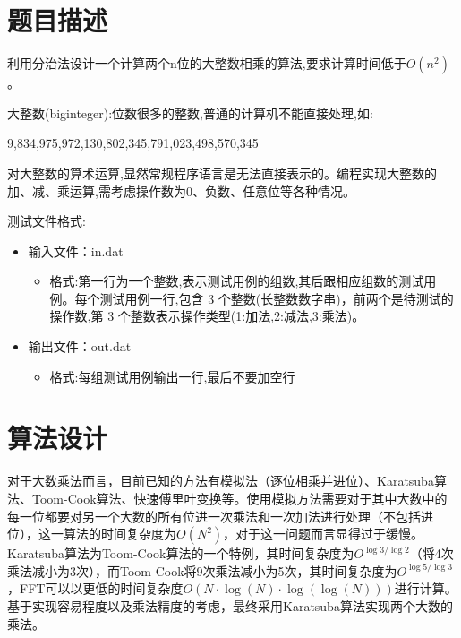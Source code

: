 \documentclass{report}
\begin{document}
\section{题目描述}
\label{sec:ti_mu_miao_shu_2}

利用分治法设计一个计算两个n位的大整数相乘的算法,要求计算时间低于$O(n^{2})$。\par

大整数(biginteger):位数很多的整数,普通的计算机不能直接处理,如: \par
\begin{centering}
9,834,975,972,130,802,345,791,023,498,570,345\par
\end{centering}
对大整数的算术运算,显然常规程序语言是无法直接表示的。编程实现大整数的加、减、乘运算,需考虑操作数为0、负数、任意位等各种情况。\par

测试文件格式:\par
\begin{itemize}
    \item 输入文件：in.dat
        \begin{itemize}
            \item 格式:第一行为一个整数,表示测试用例的组数,其后跟相应组数的测试用例。每个测试用例一行,包含 3 个整数(长整数数字串)，前两个是待测试的操作数,第 3 个整数表示操作类型(1:加法,2:减法,3:乘法)。
        \end{itemize}
    \item 输出文件：out.dat
        \begin{itemize}
    \item 格式:每组测试用例输出一行,最后不要加空行
        \end{itemize}
\end{itemize}

\section{算法设计}
\label{sec:suan_fa_she_ji_2}
对于大数乘法而言，目前已知的方法有模拟法（逐位相乘并进位）、Karatsuba算法、Toom-Cook算法、快速傅里叶变换等。使用模拟方法需要对于其中大数中的每一位都要对另一个大数的所有位进一次乘法和一次加法进行处理（不包括进位），这一算法的时间复杂度为$O(N^{2})$，对于这一问题而言显得过于缓慢。Karatsuba算法为Toom-Cook算法的一个特例，其时间复杂度为$O^{\log{3}/\log{2}}$（将4次乘法减小为3次），而Toom-Cook将9次乘法减小为5次，其时间复杂度为$O^{\log{5}/\log{3}}$，FFT可以以更低的时间复杂度$O(N\cdot\log{(N)\cdot\log{(\log{(N)})}})$进行计算。基于实现容易程度以及乘法精度的考虑，最终采用Karatsuba算法实现两个大数的乘法。\par
\end{document}
